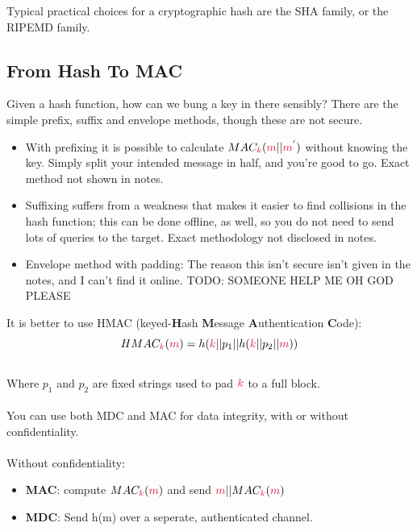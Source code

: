     Typical practical choices for a cryptographic hash are the SHA family, or the RIPEMD family.

    \subsection{From Hash To MAC}

    Given a hash function, how can we bung a key in there sensibly? There are the simple prefix, suffix and envelope methods, though these are not secure.
    \begin{itemize}
        \item With prefixing it is possible to calculate $MAC_{\ck}(\cm||\cm^{'})$ without knowing the key. Simply split your intended message in half, and you're good to go. Exact method not shown in notes.
        \item Suffixing suffers from a weakness that makes it easier to find collisions in the hash function; this can be done offline, as well, so you do not need to send lots of queries to the target. Exact methodology not disclosed in notes.
        \item Envelope method with padding: The reason this isn't secure isn't given in the notes, and I can't find it online. TODO: SOMEONE HELP ME OH GOD PLEASE
    \end{itemize}

    It is better to use HMAC (keyed-\textbf{H}ash \textbf{M}essage \textbf{A}uthentication \textbf{C}ode):\\
    $$HMAC_{\ck}(\cm) = h(\ck||p_{1}||h(\ck||p_{2}||\cm))$$
    \\
    Where $p_{1}$ and $p_{2}$ are fixed strings used to pad $\ck$ to a full block.\\
    \\
    You can use both MDC and MAC for data integrity, with or without confidentiality.\\
    \\

    Without confidentiality:
    \begin{itemize}
        \item \textbf{MAC}: compute $MAC_{\ck}(\cm)$ and send $\cm||MAC_{\ck}(\cm)$
        \item \textbf{MDC}: Send h(m) over a seperate, authenticated channel.
    \end{itemize}

